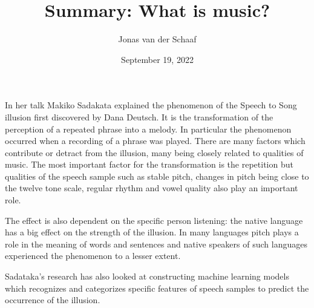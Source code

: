 \documentclass{article}
\title{Summary: What is music?}
\date{September 19, 2022}
\author{Jonas van der Schaaf}
\begin{document}
\maketitle

In her talk Makiko Sadakata explained the phenomenon of the Speech to Song
illusion first discovered by Dana Deutsch. It is the transformation of the
perception of a repeated phrase into a melody. In particular the phenomenon
occurred when a recording of a phrase was played. There are many factors which
contribute or detract from the illusion, many being closely related to qualities
of music. The most important factor for the transformation is the repetition but
qualities of the speech sample such as stable pitch, changes in pitch being
close to the twelve tone scale, regular rhythm and vowel quality also play an
important role.

The effect is also dependent on the specific person listening: the native
language has a big effect on the strength of the illusion. In many languages
pitch plays a role in the meaning of words and sentences and native speakers of
such languages experienced the phenomenon to a lesser extent.

Sadataka's research has also looked at constructing machine learning models
which recognizes and categorizes specific features of speech samples to predict
the occurrence of the illusion.
\end{document}
